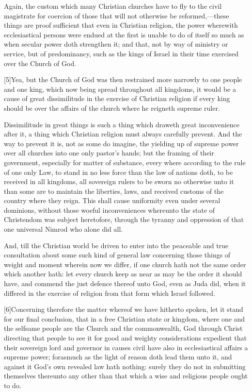 Again, the custom which many Christian churches have to fly to the civil magistrate for coercion of those that will not otherwise be reformed,—these things are proof sufficient that even in Christian religion, the power wherewith ecclesiastical persons were endued at the first is unable to do of itself so much as when secular power doth strengthen it; and that,  not by way of ministry or service, but of predominancy, such as the kings of Israel in their time exercised over the Church of God.

[5]Yea, but the Church of God was then restrained more narrowly to one people and one king, which now being spread throughout all kingdoms, it would be a cause of great dissimilitude in the exercise of Christian religion if every king should be over the affairs of the church where he reigneth supreme ruler.

Dissimilitude in great things is such a thing which draweth great inconvenience after it, a thing which Christian religion must always carefully prevent. And the way to prevent it is, not as some do imagine, the yielding up of supreme power over all churches into one only pastor’s hands; but the framing of their government, especially for matter of substance, every where according to the rule of one only Law, to stand in no less force than the law of nations doth, to be received in all kingdoms, all sovereign rulers to be sworn no otherwise unto it than some are to maintain the liberties, laws, and received customs of the country where they reign. This shall cause uniformity even under several dominions, without those woeful inconveniences whereunto the state of Christendom was subject heretofore, through the tyranny and oppression of that one universal Nimrod who alone did all.

And, till the Christian world be driven to enter into the peaceable and true consultation about some such kind of general law concerning those things of weight and moment wherein now we differ, if one church hath not the same order which another hath: let every church keep as near as may be the order it should have, and commend the just defence thereof unto God, even as Juda did, when it differed in the exercise of religion from that form which Israel followed.

[6]Concerning therefore the matter whereof we have hitherto spoken, let it stand for our final conclusion, that in a free Christian state or kingdom, where one and the selfsame people are the Church and the commonwealth, God through  Christ directing that people to see it for good and weighty considerations expedient that their sovereign lord and governor in causes civil have also in ecclesiastical affairs a supreme power; forasmuch as the light of reason doth lead them unto it, and against it God’s own revealed law hath nothing: surely they do not in submitting themselves thereunto any other than that which a wise and religious people ought to do.

